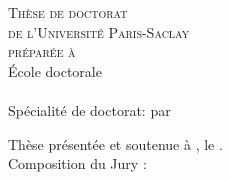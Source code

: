 \vspace{6cm}
\color{blue!20!red!45!black} %
  \begin{center}    
    \LARGE\textsc{Thèse de doctorat\\ de l'Université Paris-Saclay} \\
    \LARGE{\textsc{préparée à \PhDworkingplace}} \\ \bigskip
  \color{black} %
	\vfill
    \Large{École doctorale \no \ecodocnum}\\ %
     \Large{\ecodoctitle}  \\

     \Large{Spécialité de doctorat: \PhDspeciality} %
    \vfill  
   \Large{par}
   \vfill
   \LARGE{\textbf{\textsc{\PhDname}}} %
    \vfill
    \Large{\PhDTitleFR} %
    \vfill
    \bigskip
\end{center}
\color{black}
\begin{flushleft}
Thèse présentée et soutenue à , le . \\
\bigskip
Composition du Jury :
\end{flushleft}

